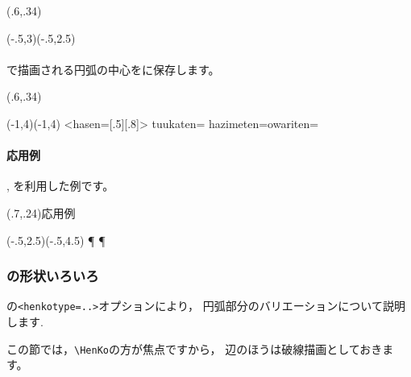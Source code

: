 \begin{showEx}(.6,.34){}
  \begin{zahyou*}[ul=8mm](-.5,3)(-.5,2.5)
    \Drawline{\A\B}
    \HenKo\A\B{}
    \Kuromaru\HenKoTyuuten
  \end{zahyou*}
\end{showEx}

\paragraph{}
で描画される円弧の中心をに保存します。

\begin{showEx}(.6,.34){}
  \begin{zahyou*}[ul=8mm](-1,4)(-1,4)
    \Drawline{\A\B}
    \HenKo\A\B{}
    \Kuromaru\HenKoTyuusin
    \Hasen{\A\HenKoTyuusin\B}
    \Enko<hasen={[.5][.8]}>\HenKoTyuusin%
      {tuukaten=\A}%
      {hazimeten=\B}{owariten=\A}
  \end{zahyou*}
\end{showEx}


\paragraph{応用例}
, を利用した例です。

\begin{showEx}(.7,.24){応用例}
  \begin{zahyou*}[ul=8mm](-.5,2.5)(-.5,4.5)
    \Drawline{\A\C}
    \HenKo\A\B{}
    \Bunten\HenKoTyuusin{}\P
    \Bunten\HenKoTyuusin{}\Q
      \Drawline{\P\Q}
    \HenKo\B\C{}
    \Bunten\HenKoTyuusin{}\P
    \Bunten\HenKoTyuusin{}\Q
      \Drawline{\P\Q}
  \end{zahyou*}
\end{showEx}

\subsubsection{の形状いろいろ}
の\verb+<henkotype=..>+オプションにより，
円弧部分のバリエーションについて説明します.

この節では，\verb+\HenKo+の方が焦点ですから，
辺のほうは破線描画としておきます。

